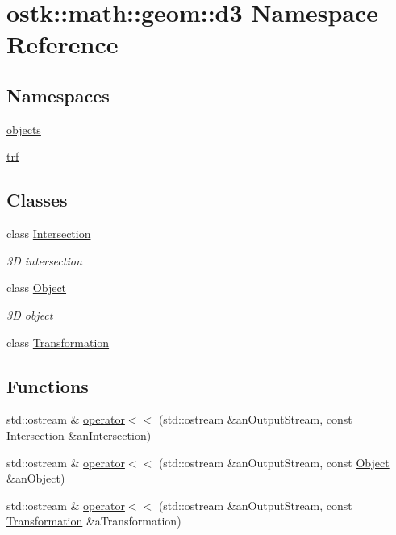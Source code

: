 \hypertarget{namespaceostk_1_1math_1_1geom_1_1d3}{}\section{ostk\+:\+:math\+:\+:geom\+:\+:d3 Namespace Reference}
\label{namespaceostk_1_1math_1_1geom_1_1d3}
\subsection*{Namespaces}
\begin{DoxyCompactItemize}
\item 
 \hyperlink{namespaceostk_1_1math_1_1geom_1_1d3_1_1objects}{objects}
\item 
 \hyperlink{namespaceostk_1_1math_1_1geom_1_1d3_1_1trf}{trf}
\end{DoxyCompactItemize}
\subsection*{Classes}
\begin{DoxyCompactItemize}
\item 
class \hyperlink{classostk_1_1math_1_1geom_1_1d3_1_1_intersection}{Intersection}
\begin{DoxyCompactList}\small\item\em 3D intersection \end{DoxyCompactList}\item 
class \hyperlink{classostk_1_1math_1_1geom_1_1d3_1_1_object}{Object}
\begin{DoxyCompactList}\small\item\em 3D object \end{DoxyCompactList}\item 
class \hyperlink{classostk_1_1math_1_1geom_1_1d3_1_1_transformation}{Transformation}
\end{DoxyCompactItemize}
\subsection*{Functions}
\begin{DoxyCompactItemize}
\item 
std\+::ostream \& \hyperlink{namespaceostk_1_1math_1_1geom_1_1d3_a1a1c2187433729bbc2ca726e3fcad54f}{operator$<$$<$} (std\+::ostream \&an\+Output\+Stream, const \hyperlink{classostk_1_1math_1_1geom_1_1d3_1_1_intersection}{Intersection} \&an\+Intersection)
\item 
std\+::ostream \& \hyperlink{namespaceostk_1_1math_1_1geom_1_1d3_afeb2282d13c7c6561751b49769d35e2e}{operator$<$$<$} (std\+::ostream \&an\+Output\+Stream, const \hyperlink{classostk_1_1math_1_1geom_1_1d3_1_1_object}{Object} \&an\+Object)
\item 
std\+::ostream \& \hyperlink{namespaceostk_1_1math_1_1geom_1_1d3_a65f68692e9b64b4d9f629eb2e89b965f}{operator$<$$<$} (std\+::ostream \&an\+Output\+Stream, const \hyperlink{classostk_1_1math_1_1geom_1_1d3_1_1_transformation}{Transformation} \&a\+Transformation)
\end{DoxyCompactItemize}


